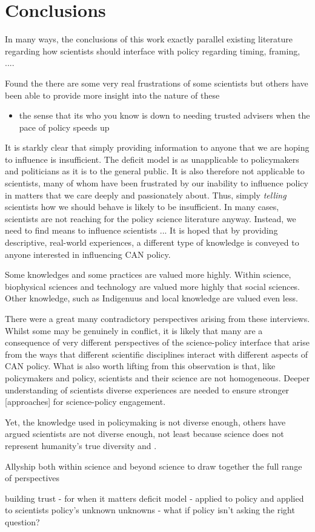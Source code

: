 \chapter{Conclusions}\label{ch:conclusions}

In many ways, the conclusions of this work exactly parallel existing literature regarding how scientists should interface with policy regarding timing, framing, ....

Found the there are some very real frustrations of some scientists but others have been able to provide more insight into the nature of these

\begin{itemize}
    \item the sense that its who you know is down to needing trusted advisers when the pace of policy speeds up 
    
\end{itemize}

It is starkly clear that simply providing information to anyone that we are hoping to influence is insufficient. The deficit model is as unapplicable to policymakers and politicians as it is to the general public. It is also therefore not applicable to scientists, many of whom have been frustrated by our inability to influence policy in matters that we care deeply and passionately about. Thus, simply \emph{telling} scientists how we should behave is likely to be insufficient. In many cases, scientists are not reaching for the policy science literature anyway. Instead, we need to find means to influence scientists ... It is hoped that by providing descriptive, real-world experiences, a different type of knowledge is conveyed to anyone interested in influencing CAN policy. 

Some knowledges and some practices are valued more highly. Within science, biophysical sciences and technology are valued more highly that social sciences. Other knowledge, such as Indigenuus and local knowledge are valued even less.

There were a great many contradictory perspectives arising from these interviews. Whilst some may be genuinely in conflict, it is likely that many are a consequence of very different perspectives of the science-policy interface that arise from the ways that different scientific disciplines interact with different aspects of CAN policy. What is also worth lifting from this observation is that, like policymakers and policy, scientists and their science are not homogeneous. Deeper understanding of scientists diverse experiences are needed to ensure stronger [approaches] for science-policy engagement.

Yet, the knowledge used in policymaking is not diverse enough, others have argued scientists are not diverse enough, not least because science does not represent humanity's true diversity and  . 

Allyship both within science and  beyond science to draw together the full range of perspectives


building trust - for when it matters
deficit model - applied to policy and applied to scientists
policy's unknown unknowns - what if policy isn't asking the right question?
